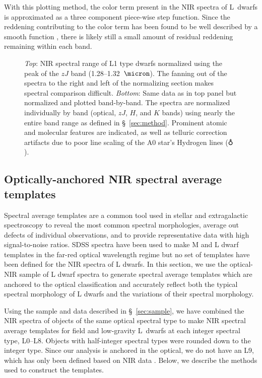 \documentclass[12pt]{aastex6}
\begin{document}
With this plotting method, the color term present in the NIR spectra of L~dwarfs is approximated as a three component piece-wise step function. Since the reddening contributing to the color term has been found to be well described by a smooth function \citep{Marocco:2014kr,Hiranaka:2016va}, there is likely still a small amount of residual reddening remaining within each band.

\begin{figure}
  \caption{\emph{Top}: NIR spectral range of L1 type dwarfs normalized using the peak of the $zJ$ band (1.28--1.32~$\micron$). The fanning out of the spectra to the right and left of the normalizing section makes spectral comparison difficult.
    \emph{Bottom}: Same data as in top panel but normalized and plotted band-by-band. The spectra are normalized individually by band (optical, $zJ$, $H$, and $K$ bands) using nearly the entire band range as defined in \S~\ref{sec:method}. Prominent atomic and molecular features are indicated, as well as telluric correction artifacts due to poor line scaling of the A0 star's Hydrogen lines ($\earth$).}
  \label{fig:L1fan}
\end{figure}

\subsection{Optically-anchored NIR spectral average templates}
\label{sec:templates}

Spectral average templates are a common tool used in stellar and extragalactic spectroscopy to reveal the most common spectral morphologies, average out defects of individual observations, and to provide representative data with high signal-to-noise ratios.
SDSS spectra have been used to make M and L dwarf templates in the far-red optical wavelength regime \citep{Bochanski07_templates, Schmidt:2014jc} but no set of templates have been defined for the NIR spectra of L dwarfs.
In this section, we use the optical-NIR sample of L dwarf spectra to generate spectral average templates which are anchored to the optical classification and accurately reflect both the typical spectral morphology of L dwarfs and the variations of their spectral morphology.

Using the sample and data described in \S~\ref{sec:sample}, we have combined the NIR spectra of objects of the same optical spectral type to make NIR spectral average templates for field and low-gravity L~dwarfs at each integer spectral type, L0--L8. Objects with half-integer spectral types were rounded down to the integer type.
Since our analysis is anchored in the optical, we do not have an L9, which has only been defined based on NIR data \citep{K99,Geballe02}.
Below, we describe the methods used to construct the templates.
\end{document}
